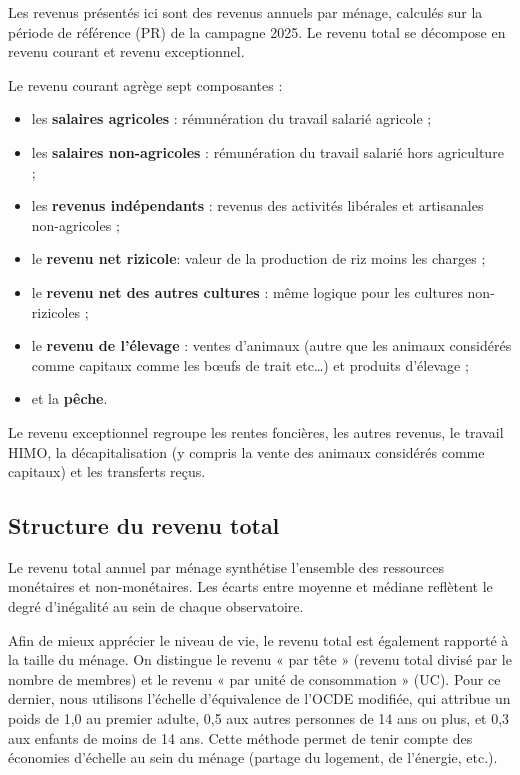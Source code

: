 \documentclass[
  french,
  letterpaper,
]{report}
\providecommand{\tightlist}{%
  \setlength{\itemsep}{0pt}\setlength{\parskip}{0pt}}
\begin{document}
Les revenus présentés ici sont des revenus annuels par ménage, calculés
sur la période de référence (PR) de la campagne 2025. Le revenu total se
décompose en revenu courant et revenu exceptionnel.

Le revenu courant agrège sept composantes :

\begin{itemize}
\tightlist
\item
  les \textbf{salaires agricoles} : rémunération du travail salarié
  agricole ;
\item
  les \textbf{salaires non-agricoles} : rémunération du travail salarié
  hors agriculture ;
\item
  les \textbf{revenus indépendants} : revenus des activités libérales et
  artisanales non-agricoles ;
\item
  le \textbf{revenu net rizicole}: valeur de la production de riz moins
  les charges ;
\item
  le \textbf{revenu net des autres cultures} : même logique pour les
  cultures non-rizicoles ;
\item
  le \textbf{revenu de l'élevage} : ventes d'animaux (autre que les
  animaux considérés comme capitaux comme les bœufs de trait etc\ldots)
  et produits d'élevage ;
\item
  et la \textbf{pêche}.
\end{itemize}

Le revenu exceptionnel regroupe les rentes foncières, les autres
revenus, le travail HIMO, la décapitalisation (y compris la vente des
animaux considérés comme capitaux) et les transferts reçus.

\subsection{Structure du revenu total}\label{structure-du-revenu-total}

Le revenu total annuel par ménage synthétise l'ensemble des ressources
monétaires et non-monétaires. Les écarts entre moyenne et médiane
reflètent le degré d'inégalité au sein de chaque observatoire.

Afin de mieux apprécier le niveau de vie, le revenu total est également
rapporté à la taille du ménage. On distingue le revenu « par tête »
(revenu total divisé par le nombre de membres) et le revenu « par unité
de consommation » (UC). Pour ce dernier, nous utilisons l'échelle
d'équivalence de l'OCDE modifiée, qui attribue un poids de 1,0 au
premier adulte, 0,5 aux autres personnes de 14 ans ou plus, et 0,3 aux
enfants de moins de 14 ans. Cette méthode permet de tenir compte des
économies d'échelle au sein du ménage (partage du logement, de
l'énergie, etc.).
\end{document}
